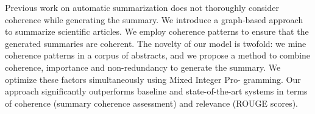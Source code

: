Previous work on automatic summarization does not thoroughly consider coherence while generating the summary. We introduce a graph-based approach to summarize scientific articles. We employ coherence patterns to ensure that the generated summaries are coherent. The novelty of our model is twofold: we mine coherence patterns in a corpus of abstracts, and we propose a method to combine coherence, importance and non-redundancy to generate the summary. We optimize these factors simultaneously using Mixed Integer Pro- gramming. Our approach significantly outperforms baseline and state-of-the-art systems in terms of coherence (summary coherence assessment) and relevance (ROUGE scores).
